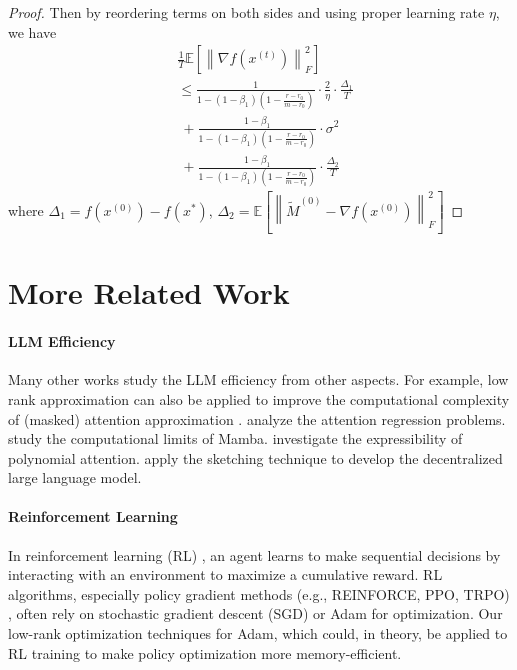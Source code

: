 \begin{proof}
Then by reordering terms on both sides and using proper learning rate $\eta$, we have 
\begin{align*}
&\frac{1}{T}\mathbb{E}\left[ \left \| \nabla  f(x^{(t)})  \right \|_F^2 \right]\\
&\leq \frac{1}{1-(1-\beta_1)(1-\frac{r-r_0}{m-r_0})}\cdot\frac{2}{\eta}\cdot\frac{\Delta_1}{T}\\
&~+\frac{1-\beta_1}{1-(1-\beta_1)(1-\frac{r-r_0}{m-r_0})}\cdot\sigma ^2\\
&~+\frac{1-\beta_1}{1-(1-\beta_1)(1-\frac{r-r_0}{m-r_0})}\cdot\frac{\Delta_2}{T}
\end{align*}
where $\Delta_1 = f(x^{(0)}) - f(x^*)$, $\Delta_2=\mathbb{E}\left[\left\|\tilde{M}^{(0)} - \nabla f(x^{(0)}) \right\|_F^2\right]$
\end{proof}


\section{More Related Work}

\paragraph{LLM Efficiency}

Many other works study the LLM efficiency from other aspects. For example, low rank approximation \cite{gsyz23,syyz23_weighted} can also be applied to improve the computational complexity of (masked) attention approximation \cite{chl+24,lssz24,as23}. \cite{gsx23,ssz23_tradeoff,swy23,gswy23,gsy23_hyper,syz23,lswy23} analyze the attention regression problems. \cite{cll+24} study the computational limits of Mamba. \cite{sxy23} investigate the expressibility of polynomial attention. \cite{gsy23_coin} apply the sketching technique to develop the decentralized large language model.


\paragraph{Reinforcement Learning}

In reinforcement learning (RL) \cite{lwcy23,ly24,llwy24,zcz+24,zcy23}, an agent learns to make sequential decisions by interacting with an environment to maximize a cumulative reward. RL algorithms, especially policy gradient methods (e.g., REINFORCE, PPO, TRPO) \cite{zhang2021sample,zakharenkov2021deep,engstrom2019implementation}, often rely on stochastic gradient descent (SGD) or Adam for optimization. Our low-rank optimization techniques for Adam, which could, in theory, be applied to RL training to make policy optimization more memory-efficient.